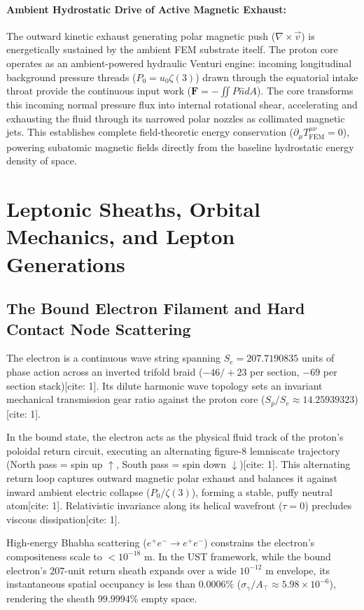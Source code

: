 \documentclass[11pt,a4paper]{article}
\begin{document}
	\paragraph{Ambient Hydrostatic Drive of Active Magnetic Exhaust:}
	The outward kinetic exhaust generating polar magnetic push ($\nabla \times \vec{v}$) is energetically sustained by the ambient FEM substrate itself. The proton core operates as an ambient-powered hydraulic Venturi engine: incoming longitudinal background pressure threads ($P_0 = u_0 \zeta(3)$) drawn through the equatorial intake throat provide the continuous input work ($\mathbf{F} = -\iint P \hat{n} dA$). The core transforms this incoming normal pressure flux into internal rotational shear, accelerating and exhausting the fluid through its narrowed polar nozzles as collimated magnetic jets. This establishes complete field-theoretic energy conservation ($\partial_\mu T^{\mu\nu}_{\text{FEM}} = 0$), powering subatomic magnetic fields directly from the baseline hydrostatic energy density of space.
	
	\section{Leptonic Sheaths, Orbital Mechanics, and Lepton Generations}
	
	\subsection{The Bound Electron Filament and Hard Contact Node Scattering}
	The electron is a continuous wave string spanning $S_e = 207.7190835$ units of phase action across an inverted trifold braid ($-46/+23$ per section, $-69$ per section stack)[cite: 1]. Its dilute harmonic wave topology sets an invariant mechanical transmission gear ratio against the proton core ($S_p / S_e \approx 14.25939323$)[cite: 1].
	
	In the bound state, the electron acts as the physical fluid track of the proton's poloidal return circuit, executing an alternating figure-8 lemniscate trajectory (North pass = spin up $\uparrow$, South pass = spin down $\downarrow$)[cite: 1]. This alternating return loop captures outward magnetic polar exhaust and balances it against inward ambient electric collapse ($P_0 / \zeta(3)$), forming a stable, puffy neutral atom[cite: 1]. Relativistic invariance along its helical wavefront ($\tau = 0$) precludes viscous dissipation[cite: 1].
	
	High-energy Bhabha scattering ($e^+e^- \to e^+e^-$) constrains the electron's compositeness scale to $< 10^{-18}\text{ m}$. In the UST framework, while the bound electron's 207-unit return sheath expands over a wide $10^{-12}\text{ m}$ envelope, its instantaneous spatial occupancy is less than $0.0006\%$ ($\sigma_\gamma / A_{\top} \approx 5.98 \times 10^{-6}$), rendering the sheath $99.9994\%$ empty space.
	
\end{document}
